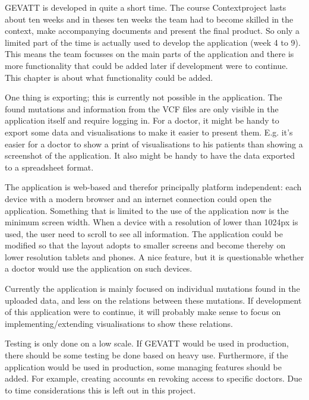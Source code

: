 GEVATT is developed in quite a short time. The course Contextproject lasts about ten weeks and in theses ten weeks the team had to become skilled in the context, make accompanying documents and present the final product. So only a limited part of the time is actually used to develop the application (week 4 to 9). This means the team focusses on the main parts of the application and there is more functionality that could be added later if development were to continue. This chapter is about what functionality could be added.

One thing is exporting; this is currently not possible in the application. The found mutations and information from the VCF files are only visible in the application itself and require logging in. For a doctor, it might be handy to export some data and visualisations to make it easier to present them. E.g. it's easier for a doctor to show a print of visualisations to his patients than showing a screenshot of the application. It also might be handy to have the data exported to a spreadsheet format.

The application is web-based and therefor principally platform independent: each device with a modern browser and an internet connection could open the application. Something that is limited to the use of the application now is the minimum screen width. When a device with a resolution of lower than 1024px is used, the user need to scroll to see all information. The application could be modified so that the layout adopts to smaller screens and become thereby on lower resolution tablets and phones. A nice feature, but it is questionable whether a doctor would use the application on such devices.

Currently the application is mainly focused on individual mutations found in the uploaded data, and less on the relations between these mutations. If development of this application were to continue, it will probably make sense to focus on implementing/extending visualisations to show these relations.

Testing is only done on a low scale. If GEVATT would be used in production, there should be some testing be done based on heavy use. Furthermore, if the application would be used in production, some managing features should be added. For example, creating accounts en revoking access to specific doctors. Due to time considerations this is left out in this project.